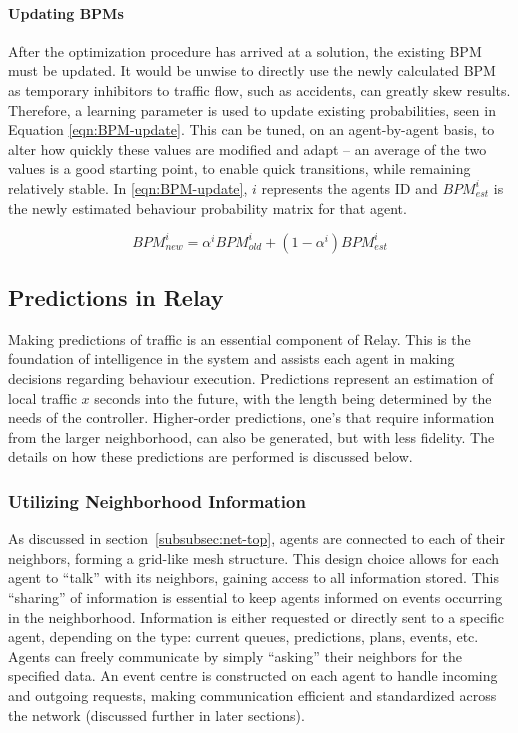\documentclass{report}
\begin{document}
\paragraph{Updating BPMs}
After the optimization procedure has arrived at a solution, the existing BPM must be updated. 
It would be unwise to directly use the newly calculated BPM as temporary inhibitors to traffic flow, such as accidents, can greatly skew results. 
Therefore, a learning parameter is used to update existing probabilities, seen in Equation \eqref{eqn:BPM-update}. 
This can be tuned, on an agent-by-agent basis, to alter how quickly these values are modified and adapt – an average of the two values is a good starting point, to enable quick transitions, while remaining relatively stable. 
In \eqref{eqn:BPM-update}, $i$ represents the agents ID and $BPM_{est}^{i}$ is the newly estimated behaviour probability matrix for that agent.

\begin{equation}
    BPM_{new}^{i} = \alpha^{i}  BPM_{old}^{i} + (1 - \alpha^{i}) BPM_{est}^{i}
    \label{eqn:BPM-update}
\end{equation}

\subsection{Predictions in Relay}
\label{sec:prediction_in_relay}

Making predictions of traffic is an essential component of Relay. 
This is the foundation of intelligence in the system and assists each agent in making decisions regarding behaviour execution. 
Predictions represent an estimation of local traffic $x$ seconds into the future, with the length being determined by the needs of the controller. 
Higher-order predictions, one’s that require information from the larger neighborhood, can also be generated, but with less fidelity. 
The details on how these predictions are performed is discussed below.

\subsubsection{Utilizing Neighborhood Information}
As discussed in section~\ref{subsubsec:net-top}, agents are connected to each of their neighbors, forming a grid-like mesh structure. 
This design choice allows for each agent to ``talk” with its neighbors, gaining access to all information stored. 
This ``sharing” of information is essential to keep agents informed on events occurring in the neighborhood.
Information is either requested or directly sent to a specific agent, depending on the type: current queues, predictions, plans, events, etc.
 Agents can freely communicate by simply ``asking” their neighbors for the specified data. 
An event centre is constructed on each agent to handle incoming and outgoing requests, making communication efficient and standardized across the network (discussed further in later sections).
\end{document}
